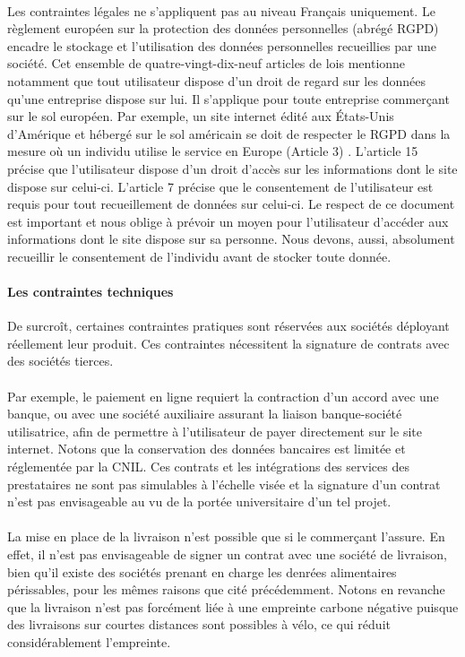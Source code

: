\documentclass[a4paper, 12pt]{article}
\begin{document}
\paragraph{}Les contraintes légales ne s’appliquent pas au niveau Français uniquement. Le règlement européen sur la protection des données personnelles (abrégé RGPD) encadre le stockage et l’utilisation des données personnelles recueillies par une société. Cet ensemble de quatre-vingt-dix-neuf articles de lois mentionne notamment que tout utilisateur dispose d’un droit de regard sur les données qu’une entreprise dispose sur lui. Il s’applique pour toute entreprise commerçant sur le sol européen.  Par exemple, un site internet édité aux États-Unis d’Amérique et hébergé sur le sol américain se doit de respecter le RGPD dans la mesure où un individu utilise le service en Europe (Article 3) \cite{rgpd} . L’article 15 précise que l’utilisateur dispose d’un droit d’accès sur les informations dont le site dispose sur celui-ci. L’article 7 précise que le consentement de l’utilisateur est requis pour tout recueillement de données sur celui-ci. Le respect de ce document est important et nous oblige à prévoir un moyen pour l’utilisateur d’accéder aux informations dont le site dispose sur sa personne. Nous devons, aussi, absolument recueillir le consentement de l’individu avant de stocker toute donnée.
\paragraph{Les contraintes techniques}De surcroît, certaines contraintes pratiques sont réservées aux sociétés déployant réellement leur produit. Ces contraintes nécessitent la signature de contrats avec des sociétés tierces.
\paragraph{}Par exemple, le paiement en ligne requiert la contraction d’un accord avec une banque, ou avec une société auxiliaire assurant la liaison banque-société utilisatrice, afin de permettre à l’utilisateur de payer directement sur le site internet. Notons que la conservation des données bancaires est limitée et réglementée par la CNIL\cite{payonline}.  Ces contrats et les intégrations des services des prestataires ne sont pas simulables à l’échelle visée et la signature d’un contrat n’est pas envisageable au vu de la portée universitaire d’un tel projet.
\paragraph{}La mise en place de la livraison n’est possible que si le commerçant l’assure. En effet, il n’est pas envisageable de signer un contrat avec une société de livraison, bien qu’il existe des sociétés prenant en charge les denrées alimentaires périssables, pour les mêmes raisons que cité précédemment. Notons en revanche que la livraison n’est pas forcément liée à une empreinte carbone négative puisque des livraisons sur courtes distances sont possibles à vélo, ce qui réduit considérablement l'empreinte.
\end{document}
